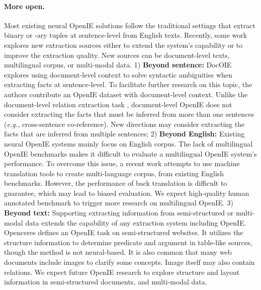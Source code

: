\documentclass{article}
\newcommand{\eg}{\emph{e.g.,}\xspace}
\begin{document}
\paragraph{More open.} Most existing neural OpenIE solutions follow the traditional settings that extract binary or -ary tuples at sentence-level from English texts. Recently, some work explores new extraction sources either to extend the system's capability or to improve the extraction quality. New sources can be document-level texts, multilingual corpus, or multi-modal data. 
1) \textbf{Beyond sentence:} DocOIE \cite{dong-etal-2021-docoie} explores using document-level context to solve syntactic ambiguities when extracting facts at sentence-level. To facilitate further research on this topic, the authors contribute an OpenIE dataset with document-level context. Unlike the document-level relation extraction task \cite{yao-etal-2019-docred}, document-level OpenIE does not consider extracting the facts that must be inferred from more than one sentences (\eg cross-sentence co-reference). New directions may consider extracting the facts that are inferred from multiple sentences;
2) \textbf{Beyond English:} Existing neural OpenIE systems mainly focus on English corpus. The lack of multilingual OpenIE benchmarks makes it difficult to evaluate a multilingual OpenIE system's performance. To overcome this issue, a recent work \cite{ro-etal-2020-multi} attempts to use machine translation tools to create multi-language corpus, from existing English benchmarks. 
However, the performance of back translation is difficult to guarantee, which may lead to biased evaluation.
We expect high-quality human annotated benchmark to trigger more research on multilingual OpenIE.
3) \textbf{Beyond text:} Supporting extracting information from semi-structured or multi-modal data extends the capability of any extraction system including OpenIE. Openceres \cite{lockard-etal-2019-openceres} defines an OpenIE task on semi-structured websites. It utilizes the structure information to determine predicate and argument in table-like sources, though the method is not neural-based. It is also common that many web documents include images to clarify some concepts. Image itself may also contain relations. We expect future OpenIE research to explore structure and layout information in semi-structured documents, and multi-modal data.
\end{document}
